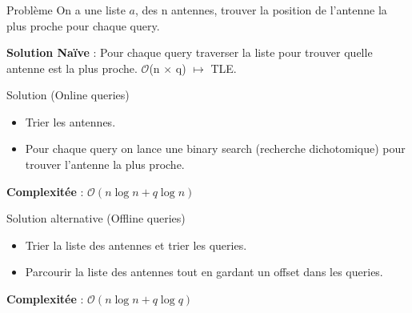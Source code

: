 \begin{frame}
    \frametitle{\problemtitle}
    \begin{block}{Problème}
        On a une liste $a$, des n antennes, trouver la position de l'antenne la plus proche pour chaque query.
    \end{block}
    \pause
    \textbf{Solution Naïve} : Pour chaque query traverser la liste pour trouver quelle antenne est la plus proche.
    \pause
     $\mathcal{O}$(n $\times$ q) $\mapsto$ TLE.\\
     \pause
     \begin{block}{Solution (Online queries)}
        \begin{itemize}
            \item<+-> Trier les antennes.
            \item<+-> Pour chaque query on lance une binary search (recherche dichotomique) pour trouver l'antenne la plus proche.
        \end{itemize}
        \pause
        \textbf{Complexitée} : $\mathcal{O}(n \log n + q\log n)$
    \end{block}
    \pause
    \begin{block}{Solution alternative (Offline queries)}
            \begin{itemize}
                \item Trier la liste des antennes et trier les queries.
                \item Parcourir la liste des antennes tout en gardant un offset dans les queries.
            \end{itemize}
            \pause
            \textbf{Complexitée} : $\mathcal{O}(n \log n + q\log q)$
    \end{block}
\end{frame}
